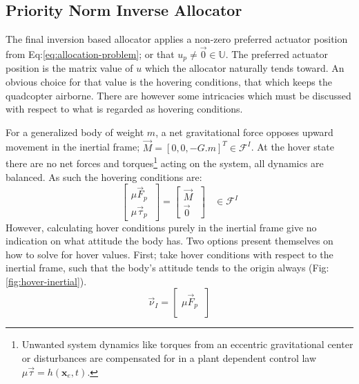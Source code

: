 {\subsection{Priority Norm Inverse Allocator}
\label{subsec:control.allocation.norminverse}
The final inversion based allocator applies a non-zero preferred actuator position from Eq:\ref{eq:allocation-problem}; or that $u_p\not=\vec{0}\in\mathbb{U}$. The preferred actuator position is the matrix value of $u$ which the allocator naturally tends toward. An obvious choice for that value is the hovering conditions, that which keeps the quadcopter airborne. There are however some intricacies which must be discussed with respect to what is regarded as hovering conditions.
\par
For a generalized body of weight $m$, a net gravitational force opposes upward movement in the inertial frame; $\vec{M}=[0, 0, -G.m]^T\in\mathcal{F}^I$. At the hover state there are no net forces and torques\footnote{Unwanted system dynamics like torques from an eccentric gravitational center or disturbances are compensated for in a plant dependent control law $\mu\vec{\tau}=h(\mathbf{x}_e,t)$.} acting on the system, all dynamics are balanced. As such the hovering conditions are:
\begin{equation}\label{eq:hover}
\begin{bmatrix}
\mu\vec{F}_p\hspace{3pt}\\
\mu\vec{\tau}_p\hspace{3pt}
\end{bmatrix}
=
\begin{bmatrix}
\vec{M}\hspace{3pt}\\
\vec{0}\hspace{3pt}
\end{bmatrix}~~~~\in\mathcal{F}^I
\end{equation}
However, calculating hover conditions purely in the inertial frame give no indication on what attitude the body has. Two options present themselves on how to solve for hover values. First; take hover conditions with respect to the inertial frame, such that the body's attitude tends to the origin always (Fig:\ref{fig:hover-inertial}). 
\begin{equation}\label{eq:hover-inertial}
\vec{\nu}_I=
\begin{bmatrix}
\mu\vec{F}_p\hspace{3pt}\\

\end{bmatrix}
\end{equation}}
